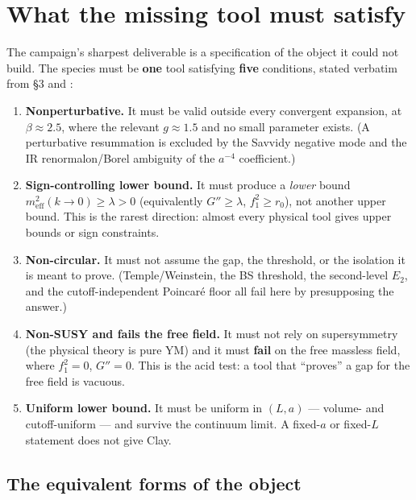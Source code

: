 \section{What the missing tool must satisfy}

\figlean
\label{sec:missing}

The campaign's sharpest deliverable is a specification of the object it could not build. The
species must be \textbf{one} tool satisfying \textbf{five} conditions, stated verbatim from
 \S3 and :

\begin{enumerate}
\item \textbf{Nonperturbative.} It must be valid outside every convergent expansion, at
  $\beta\approx2.5$, where the relevant $g\approx1.5$ and no small parameter exists. (A
  perturbative resummation is excluded by the Savvidy negative mode and the IR renormalon/Borel
  ambiguity of the $a^{-4}$ coefficient.)
\item \textbf{Sign-controlling lower bound.} It must produce a \emph{lower} bound
  $m_{\mathrm{eff}}^2(k\to0)\ge\lambda>0$ (equivalently $G''\ge\lambda$, $f_1^2\ge r_0$), not
  another upper bound. This is the rarest direction: almost every physical tool gives upper
  bounds or sign constraints.
\item \textbf{Non-circular.} It must not assume the gap, the threshold, or the isolation it is
  meant to prove. (Temple/Weinstein, the BS threshold, the second-level $E_2$, and the
  cutoff-independent Poincar\'e floor all fail here by presupposing the answer.)
\item \textbf{Non-SUSY and fails the free field.} It must not rely on supersymmetry (the physical
  theory is pure YM) and it must \textbf{fail} on the free massless field, where $f_1^2=0$,
  $G''=0$. This is the acid test: a tool that ``proves'' a gap for the free field is vacuous.
\item \textbf{Uniform lower bound.} It must be uniform in $(L,a)$ --- volume- and
  cutoff-uniform --- and survive the continuum limit. A fixed-$a$ or fixed-$L$ statement does not
  give Clay.
\end{enumerate}

\subsection{The equivalent forms of the object}

